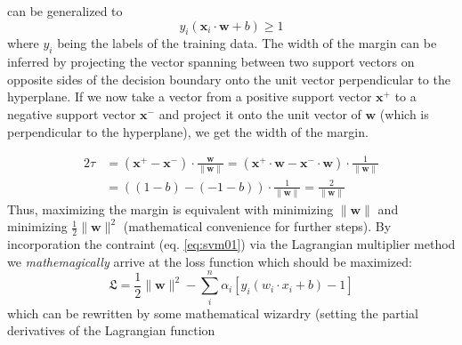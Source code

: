 can be generalized to 
\begin{equation}
	\label{eq:svm01}
	y_i(\mathbf{x}_i \cdot \mathbf{w} + b ) \geqslant 1 %
\end{equation}
where $y_i$ being the labels of the training data. 
The width of the margin can be inferred by projecting the vector spanning between two support vectors 
on opposite sides of the decision boundary onto the unit vector perpendicular to the hyperplane. 
If we now take a vector from a positive support vector $\mathbf{x}^+$ to a negative support vector $\mathbf{x}^-$ and project it onto the unit vector of $\mathbf{w}$ (which is perpendicular to the hyperplane), 
we get the width of the margin. 
\iffalse
\begin{equation}
	\label{eq:svm02}
	\begin{aligned} 
		2\tau &= (\mathbf{x}^+ - \mathbf{x}^-) \cdot \frac{\mathbf{w}}{\|\mathbf{w}\|} \\
			&= (x^+ \cdot \mathbf{w} - x^-\cdot \mathbf{w} ) \cdot \frac{1}{\|\mathbf{w}\|} \\
			&= ( (1-b) - (-1-b) ) \cdot \frac{1}{\|\mathbf{w}\|} \\
			&= \frac{2}{\|w\|}
	\end{aligned}
\end{equation}
\fi
\begin{equation}
	\label{eq:svm02}
	\begin{aligned} 
		2\tau &= (\mathbf{x}^+ - \mathbf{x}^-) \cdot \frac{\mathbf{w}}{\|\mathbf{w}\|} 
			= (\mathbf{x}^+ \cdot \mathbf{w} - \mathbf{x}^-\cdot \mathbf{w} ) \cdot \frac{1}{\|\mathbf{w}\|} \\
			&= ( (1-b) - (-1-b) ) \cdot \frac{1}{\|\mathbf{w}\|} 
			= \frac{2}{\|\mathbf{w}\|}
	\end{aligned}
\end{equation}
Thus, maximizing the margin is equivalent with minimizing $\|\mathbf{w}\|$ and minimizing $\frac{1}{2}\|\mathbf{w}\|^2$ (mathematical convenience for further steps).
By incorporation the contraint (eq. \ref{eq:svm01}) via the Lagrangian multiplier method we 
\textit{mathemagically} arrive at the loss function which should be maximized: 
\begin{equation}
	\label{eq:svm03}
	\mathfrak{L} = \frac{1}{2} \|\mathbf{w}\|^2 - \sum_i^n \alpha_i [ y_i ( w_i \cdot x_i + b) -1 ] 
\end{equation}
which can be rewritten by some mathematical wizardry (setting the partial derivatives of the Lagrangian function

